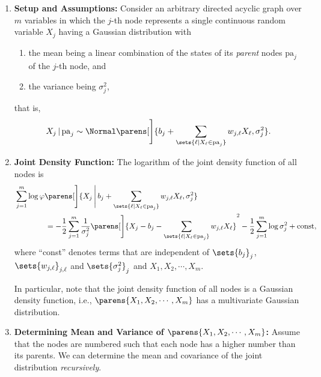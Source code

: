 \documentclass[12pt]{article}
\begin{document}
\begin{enumerate}[label=\textbf{\arabic*.}]

	\item \textbf{Setup and Assumptions:} Consider an arbitrary directed acyclic graph over $m$ variables in which the $j$-th node represents a single continuous random variable $X_j$ having a Gaussian distribution with 
	\begin{enumerate}
		\item the mean being a linear combination of the states of its \emph{parent} nodes $\mathrm{pa}_j$ of the $j$-th node, and 
		\item the variance being $\sigma_j^2$, 
	\end{enumerate}
	that is, 
	\begin{align}\label{eq-linear-gau-1}
		X_j \,\vert\, \mathrm{pa}_j \sim \Normal \parens[\Bigg]{b_j + \sum_{\sets{\ell \vert X_\ell \in \mathrm{pa}_j}} w_{j, \ell} X_{\ell}, \sigma_j^2}. 
	\end{align}
	
	\item \textbf{Joint Density Function:} The logarithm of the joint density function of all nodes is 
	\begin{align}
		& \sum_{j=1}^m \log \varphi \parens[\Bigg]{X_j \,\Bigg\vert\, b_j + \sum_{\sets{\ell \vert X_\ell \in \mathrm{pa}_j}} w_{j, \ell} X_{\ell}, \sigma_j^2} \nonumber \\ 
		& \qquad \qquad = - \frac{1}{2} \sum_{j=1}^m \frac{1}{\sigma_j^2} \parens[\Bigg]{X_j - b_j - \sum_{\sets{\ell \vert X_\ell \in \mathrm{pa}_j}} w_{j, \ell} X_{\ell}}^2 - \frac{1}{2} \sum_{j=1}^m \log \sigma_j^2 + \text{const}, 
	\end{align}
	where ``const'' denotes terms that are independent of $\sets{b_j}_{j}$, $\sets{w_{j, \ell}}_{j, \ell}$ and $\sets{\sigma_j^2}_j$ and $X_1, X_2, \cdots, X_m$. 
	
	In particular, note that the joint density function of all nodes is a Gaussian density function, i.e., $\parens{X_1, X_2, \cdots, X_m}$ has a multivariate Gaussian distribution. 
	
	\item \textbf{Determining Mean and Variance of $\parens{X_1, X_2, \cdots, X_m}$:} Assume that the nodes are numbered such that each node has a higher number than its parents. We can determine the mean and covariance of the joint distribution \emph{recursively}. 
	

\end{enumerate}
\end{document}
